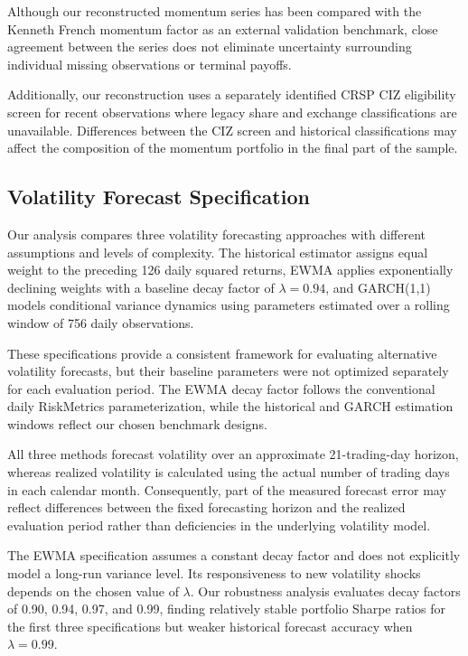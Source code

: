 \documentclass[11pt]{article}
\begin{document}
Although our reconstructed momentum series has
been compared with the Kenneth French momentum
factor as an external validation benchmark,
close agreement between the series does not
eliminate uncertainty surrounding individual
missing observations or terminal payoffs.

Additionally, our reconstruction uses a
separately identified CRSP CIZ eligibility
screen for recent observations where legacy
share and exchange classifications are
unavailable. Differences between the CIZ
screen and historical classifications may
affect the composition of the momentum
portfolio in the final part of the sample.


\subsection{Volatility Forecast Specification}

Our analysis compares three volatility forecasting
approaches with different assumptions and levels
of complexity. The historical estimator assigns
equal weight to the preceding 126 daily squared
returns, EWMA applies exponentially declining
weights with a baseline decay factor of
$\lambda=0.94$, and GARCH(1,1) models conditional
variance dynamics using parameters estimated
over a rolling window of 756 daily observations.

These specifications provide a consistent
framework for evaluating alternative volatility
forecasts, but their baseline parameters were
not optimized separately for each evaluation
period. The EWMA decay factor follows the
conventional daily RiskMetrics parameterization,
while the historical and GARCH estimation
windows reflect our chosen benchmark designs.

All three methods forecast volatility over an
approximate 21-trading-day horizon, whereas
realized volatility is calculated using the
actual number of trading days in each calendar
month. Consequently, part of the measured
forecast error may reflect differences between
the fixed forecasting horizon and the realized
evaluation period rather than deficiencies
in the underlying volatility model.

The EWMA specification assumes a constant
decay factor and does not explicitly model
a long-run variance level. Its responsiveness
to new volatility shocks depends on the
chosen value of $\lambda$. Our robustness
analysis evaluates decay factors of
0.90, 0.94, 0.97, and 0.99, finding
relatively stable portfolio Sharpe ratios
for the first three specifications but
weaker historical forecast accuracy
when $\lambda=0.99$.
\end{document}
